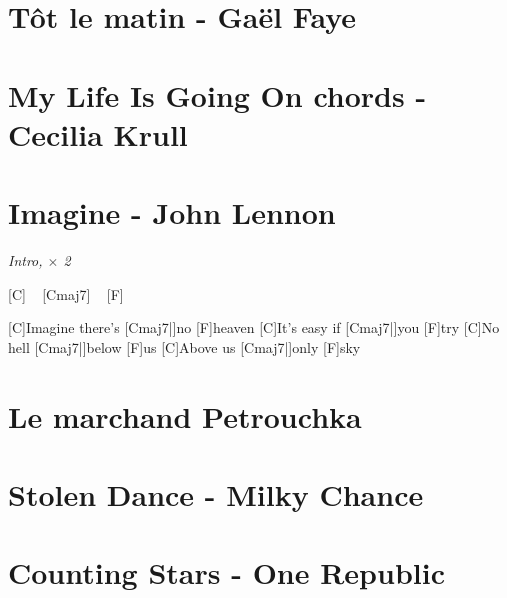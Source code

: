 \documentclass{guitartabs}
\begin{document}
\section{Tôt le matin - Gaël Faye}
\begin{guitar}

\end{guitar}

\section{My Life Is Going On chords - Cecilia Krull }
\begin{guitar}

\end{guitar}


\section{Imagine - John Lennon}

\begin{guitar}


\emph{Intro, $\times$ 2}%

[C] ~ [Cmaj7]  ~ [F]  ~  %

[C]Imagine there's [Cmaj7|]{no} [F]heaven
[C]It's easy if [Cmaj7|]{you} [F]try
[C]No hell [Cmaj7|]{below} [F]us
[C]Above us [Cmaj7|]{only} [F]sky
\end{guitar}


\section{Le marchand Petrouchka}
\begin{guitar}

\end{guitar}


\section{Stolen Dance - Milky Chance}

\begin{guitar}

\end{guitar}

\section{Counting Stars - One Republic}
\begin{guitar}

\end{guitar}
\end{document}

